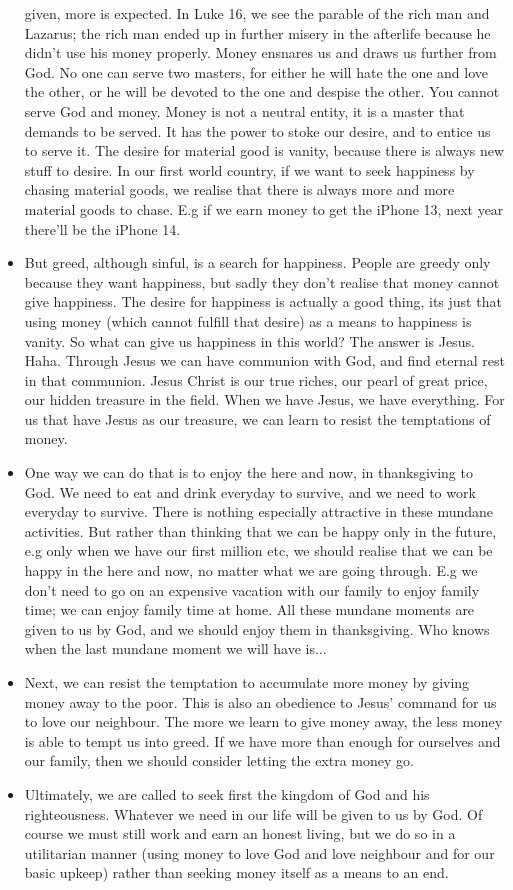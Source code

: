 \begin{itemize}
{  given, more is expected.  In Luke 16, we see the parable of the rich man
  and Lazarus; the rich man ended up in further misery in the afterlife
  because he didn't use his money properly.  Money ensnares us and draws us
  further from God.  No one can serve two masters, for either he will hate
  the one and love the other, or he will be devoted to the one and despise
  the other.  You cannot serve God and money.  Money is not a neutral entity,
  it is a master that demands to be served.  It has the power to stoke our
  desire, and to entice us to serve it.  The desire for material good is
  vanity, because there is always new stuff to desire.  In our first world
  country, if we want to seek happiness by chasing material goods, we realise
  that there is always more and more material goods to chase.  E.g if we earn
  money to get the iPhone 13, next year there'll be the iPhone 14.}
  \item{But greed, although sinful, is a search for happiness.  People are
  greedy only because they want happiness, but sadly they don't realise that
  money cannot give happiness.  The desire for happiness is actually a good
  thing, its just that using money (which cannot fulfill that desire) as a
  means to happiness is vanity.  So what can give us happiness in this world?
  The answer is Jesus.  Haha.  Through Jesus we can have communion with God,
  and find eternal rest in that communion.  Jesus Christ is our true riches,
  our pearl of great price, our hidden treasure in the field.  When we have
  Jesus, we have everything.  For us that have Jesus as our treasure, we can
  learn to resist the temptations of money.}
  \item{One way we can do that is to enjoy the here and now, in thanksgiving
  to God.  We need to eat and drink everyday to survive, and we need to work
  everyday to survive.  There is nothing especially attractive in these
  mundane activities.  But rather than thinking that we can be happy only in
  the future, e.g only when we have our first million etc, we should realise
  that we can be happy in the here and now, no matter what we are going
  through.  E.g we don't need to go on an expensive vacation with our family
  to enjoy family time; we can enjoy family time at home.  All these mundane
  moments are given to us by God, and we should enjoy them in thanksgiving.
  Who knows when the last mundane moment we will have is...}
  \item{Next, we can resist the temptation to accumulate more money by giving
  money away to the poor.  This is also an obedience to Jesus' command for us
  to love our neighbour.  The more we learn to give money away, the less
  money is able to tempt us into greed.  If we have more than enough for
  ourselves and our family, then we should consider letting the extra money
  go.}
  \item{Ultimately, we are called to seek first the kingdom of God and his
  righteousness.  Whatever we need in our life will be given to us by God.
  Of course we must still work and earn an honest living, but we do so in a
  utilitarian manner (using money to love God and love neighbour and for our
  basic upkeep) rather than seeking money itself as a means to an end.}
\end{itemize}